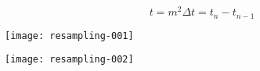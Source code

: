 \documentclass{article}
\begin{document}


\[
t = m^2
\Delta t = t_{n} - t_{n-1}
\]

\texttt{[image: resampling-001]}

\texttt{[image: resampling-002]}
\end{document}

